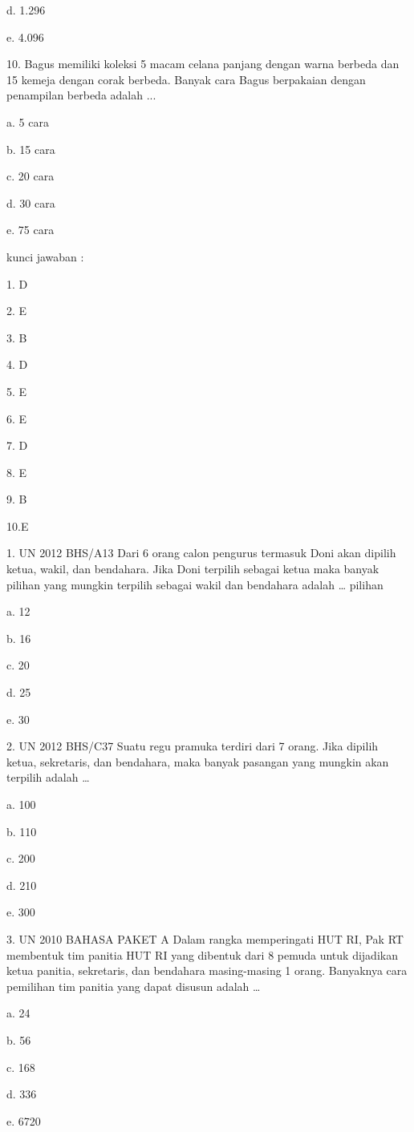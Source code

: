 \documentclass[11pt,fleqn]{book} %
\begin{document}
d.	1.296

e.	4.096

10. Bagus memiliki koleksi 5 macam celana panjang dengan warna berbeda dan 15 kemeja dengan corak berbeda. Banyak cara Bagus berpakaian dengan penampilan berbeda adalah ... 

a.	5 cara

b.	15 cara

c.	20 cara

d.	30 cara

e.	75 cara



kunci jawaban :

1. D

2. E

3. B 

4. D

5. E

6. E

7. D

8. E

9. B

10.E


1.	UN 2012 BHS/A13
Dari 6 orang calon pengurus termasuk Doni akan dipilih ketua, wakil, dan bendahara. Jika Doni terpilih sebagai ketua maka banyak pilihan yang mungkin terpilih sebagai wakil dan bendahara adalah … pilihan

a.	12

b.	16

c.	20

d.	25

e.	30

2.	UN 2012 BHS/C37
Suatu regu pramuka terdiri dari 7 orang. Jika dipilih ketua, sekretaris, dan bendahara, maka banyak pasangan yang mungkin akan terpilih adalah …

a.	100

b.	110

c.	200

d.	210

e.	300

3.	UN 2010 BAHASA PAKET A 
Dalam rangka memperingati HUT RI, Pak RT membentuk tim panitia HUT RI yang dibentuk dari 8 pemuda untuk dijadikan ketua panitia, sekretaris, dan bendahara masing-masing 1 orang. Banyaknya cara pemilihan tim panitia yang dapat disusun adalah …

a.	24

b.	56

c.	168

d.	336

e.	6720
\end{document}
